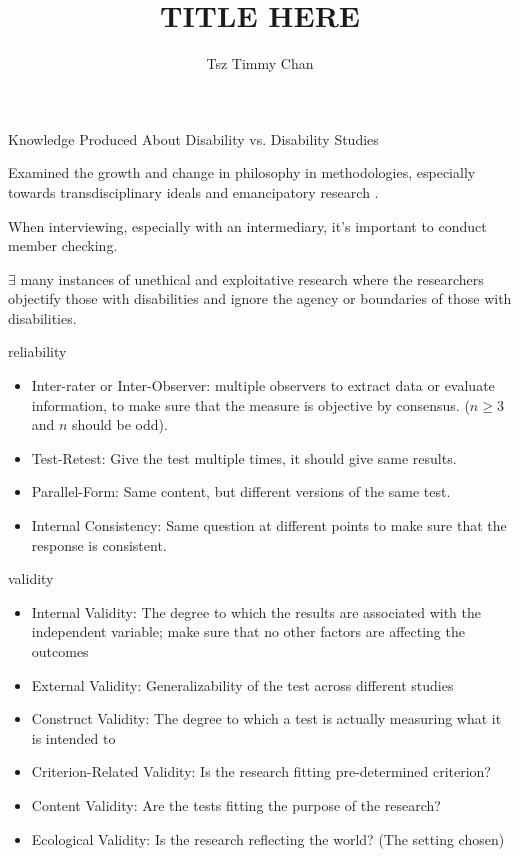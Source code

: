 \documentclass{TC}
\title{TITLE HERE}	%
\author{Tsz Timmy Chan}	%
\begin{document}
Knowledge Produced About Disability vs. Disability Studies

Examined the growth and change in philosophy in methodologies, especially towards transdisciplinary ideals and emancipatory research \parencite{barnes_what_2003, kitchin_researched_2000, goodley_decolonizing_2012,
tregaskis_disability_2005}. 

When interviewing, especially with an \gls{intermediary}, it's important to conduct \gls{member checking}.

$\exists$ many instances of unethical and exploitative research where the researchers objectify those with disabilities and ignore the agency or boundaries of those with disabilities.

\begin{definition}
\glsdesc{reliability}
\end{definition}
\begin{itemize}
\item Inter-rater or Inter-Observer: multiple observers to extract data or evaluate information, to make sure that the measure is objective by consensus. ($n \geq 3$ and $n$ should be odd).

\item Test-Retest: Give the test multiple times, it should give same results.

\item Parallel-Form: Same content, but different versions of the same test. 

\item Internal Consistency: Same question at different points to make sure that the response is consistent.  
\end{itemize}

\begin{definition}
\glsdesc{validity}
\end{definition}

\begin{itemize}
\item Internal Validity: The degree to which the results are associated with the independent variable; make sure that no other factors are affecting the outcomes

\item External Validity: Generalizability of the test across different studies

\item Construct Validity: The degree to which a test is actually measuring what it is intended to

\item Criterion-Related Validity: Is the research fitting pre-determined criterion?

\item Content Validity: Are the tests fitting the purpose of the research?

\item Ecological Validity: Is the research reflecting the world? (The setting chosen)
\end{itemize}
\end{document}
